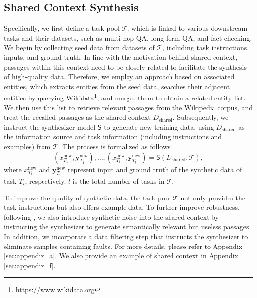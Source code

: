 \documentclass[11pt]{article}
\begin{document}
\subsection{Shared Context Synthesis}
\label{sec:3-2}


Specifically, we first define a task pool $\mathcal{T}$, which is linked to various downstream tasks and their datasets, such as multi-hop QA, long-form QA, and fact checking. We begin by collecting seed data from datasets of $\mathcal{T}$, including task instructions, inputs, and ground truth. In line with the motivation behind shared context, passages within this context need to be closely related to facilitate the synthesis of high-quality data. Therefore, we employ an approach based on associated entities, which extracts entities from the seed data, searches their adjacent entities by querying Wikidata\footnote{\url{https://www.wikidata.org}}, and merges them to obtain a related entity list. We then use this list to retrieve relevant passages from the Wikipedia corpus, and treat the recalled passages as the shared context $D_{\mathrm{shared}}$. Subsequently, we instruct the synthesizer model $\mathsf{S}$ to generate new training data, using $D_{\mathrm{shared}}$ as the information source and task information (including instructions and examples) from $\mathcal{T}$. The process is formalized as follows:
\begin{equation}
    \left ( x^{\mathrm{new} }_{T_1}, \mathbf{y}^{\mathrm{new} }_{T_1} \right ),\dots,\left ( x^{\mathrm{new} }_{T_{l}},\mathbf{y}^{\mathrm{new} }_{T_{l}} \right )=\mathsf{S}\left ( D_{\mathrm{shared} },\mathcal{T} \right ),
\end{equation}
where $x^{\mathrm{new}}_{T_i}$ and $\mathbf{y}^{\mathrm{new}}_{T_i}$ represent input and ground truth of the synthetic data of task $T_i$, respectively. $l$ is the total number of tasks in $\mathcal{T}$.

To improve the quality of synthetic data, the task pool $\mathcal{T}$ not only provides the task instructions but also offers example data. To further improve robustness, following \citet{raat, arellmgoodatutilityjudgements}, we also introduce synthetic noise into the shared context by instructing the synthesizer to generate semantically relevant but useless passages. In addition, we incorporate a data filtering step that instructs the synthesizer to eliminate samples containing faults. For more details, please refer to Appendix \ref{sec:appendix_a}. We also provide an example of shared context in Appendix \ref{sec:appendix_f}.
\end{document}
